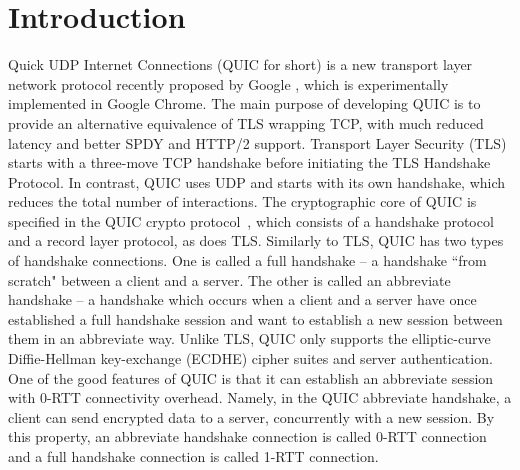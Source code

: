 \section{Introduction} \label{sec:intro}
Quick UDP Internet Connections (QUIC for short) is a
new transport layer network protocol recently proposed
by Google \cite{QUIC,QUICDraft}, which is experimentally
implemented in Google Chrome.
The main purpose of developing QUIC is to provide an
alternative equivalence of TLS wrapping TCP, with much
reduced latency and better SPDY and HTTP/2 support.
Transport Layer Security (TLS) starts with a three-move
TCP handshake before initiating the TLS Handshake
Protocol.
In contrast, QUIC uses UDP and starts with its own
handshake, which reduces the total number of
interactions.
The cryptographic core of QUIC is specified in the QUIC
crypto protocol~\cite{QUIC:Crypto}, which consists of a
handshake protocol and a record layer protocol, as does
TLS.
Similarly to TLS, QUIC has two types of handshake
connections.
One is called a full handshake -- a handshake
``from scratch" between a client and a server.
The other is called an abbreviate handshake -- a
handshake which occurs when a client and a server have
once established a full handshake session and want to
establish a new session between them in an abbreviate way.
Unlike TLS, QUIC only supports the elliptic-curve
Diffie-Hellman key-exchange (ECDHE) cipher suites and
server authentication.
%
One of the good features of QUIC is that it can
establish an abbreviate session with $0$-RTT
connectivity overhead.
Namely, in the QUIC abbreviate handshake, a client can send
encrypted data to a server, concurrently with a new session.
By this property, an abbreviate handshake connection is called
0-RTT connection and a full handshake connection is called
1-RTT connection.

